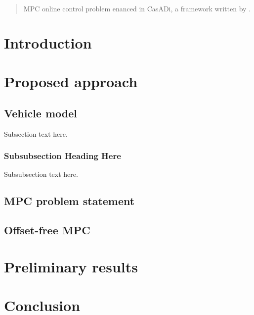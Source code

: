 \documentclass[conference]{IEEEtran}
\begin{document}

\begin{abstract}
MPC online control problem enanced in CasADi, a framework written by \citet{Andersson2019}.
\end{abstract}

\IEEEpeerreviewmaketitle

\section{Introduction}

\lipsum[1]


\section{Proposed approach} %

\lipsum[2]

\subsection{Vehicle model}
Subsection text here.

\subsubsection{Subsubsection Heading Here}
Subsubsection text here.

\subsection{MPC problem statement}

\lipsum[3]

\subsection{Offset-free MPC}

\lipsum[4]


\section{Preliminary results}

\lipsum[5]
  

\section{Conclusion} 
\label{sec:conclusion}

\lipsum[6]




\end{document}

